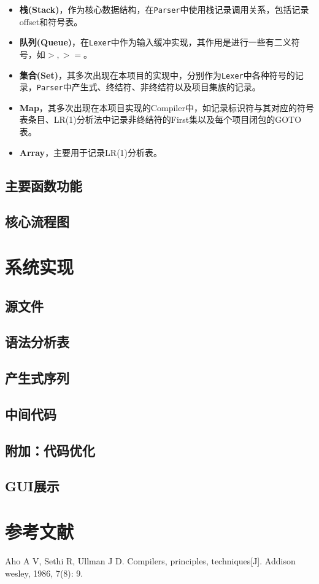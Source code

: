 \documentclass{ML}
\begin{document}
\begin{itemize}
    \item \textbf{栈(Stack)}，作为核心数据结构，在\texttt{Parser}中使用栈记录调用关系，包括记录offset和符号表。
    \item \textbf{队列(Queue)}，在\texttt{Lexer}中作为输入缓冲实现，其作用是进行一些有二义符号，如$>, >=$。
    \item \textbf{集合(Set)}，其多次出现在本项目的实现中，分别作为\texttt{Lexer}中各种符号的记录，\texttt{Parser}中产生式、终结符、非终结符以及项目集族的记录。
    \item \textbf{Map}，其多次出现在本项目实现的Compiler中，如记录标识符与其对应的符号表条目、LR(1)分析法中记录非终结符的First集以及每个项目闭包的GOTO表。
    \item \textbf{Array}，主要用于记录LR(1)分析表。
\end{itemize}

\subsection{主要函数功能}

\subsection{核心流程图}

\section{系统实现}
\subsection{源文件}
\subsection{语法分析表}
\subsection{产生式序列}
\subsection{中间代码}
\subsection{附加：代码优化}
\subsection{GUI展示}
\appendix

\section{参考文献}
\begin{thebibliography}{20}
     Aho A V, Sethi R, Ullman J D. Compilers, principles, techniques[J]. Addison wesley, 1986, 7(8): 9.
\end{thebibliography}
\end{document}
